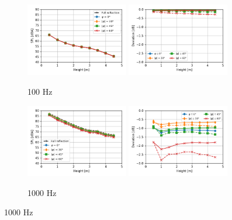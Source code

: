 \begin{figure}[H]
	\centering
	\begin{subfigure}[b]{\textwidth}
		\centering
		\includegraphics[width=0.49\textwidth]{fig/chap5/impedance/third_octave/SPL_100_Hz.png}
		\includegraphics[width=0.49\textwidth]{fig/chap5/impedance/third_octave/deviation_100_Hz.png}
		\caption{100 Hz}
	\end{subfigure}
	\begin{subfigure}[b]{\textwidth}
		\centering
		\includegraphics[width=0.49\textwidth]{fig/chap5/impedance/third_octave/SPL_1000_Hz.png}
		\includegraphics[width=0.49\textwidth]{fig/chap5/impedance/third_octave/deviation_1000_Hz.png}
		\caption{1000 Hz}
	\end{subfigure}
\end{figure}
